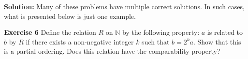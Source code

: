 \documentclass[12pt,oneside]{exam}
\newenvironment{exercise}[1]{\vspace{.1in}\noindent\textbf{Exercise #1 \hspace{.05em}}}{}
\newenvironment{newsolution}{\vspace{.1in}\noindent\textbf{Solution: \hspace{.05em}}}{}
\begin{document}
\begin{newsolution}
Many of these problems have multiple correct solutions. In such cases, what is presented below is just one example.
\end{newsolution}

\begin{exercise}{6}
Define the relation $R$ on $\mathbb{N}$ by the following property: $a$ is related to $b$ by $R$ if there exists a non-negative integer $k$ such that $b=2^ka$. Show that this is a partial ordering. Does this relation have the comparability property?
\end{exercise}
\end{document}
